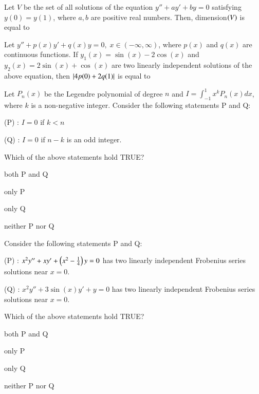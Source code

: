 \documentclass[journal]{IEEEtran}
\numberwithin{equation}{enumi}
\numberwithin{figure}{enumi}
\begin{document}
\begin{enumerate}
{\hfill{}

\item Let $V$ be the set of all solutions of the equation $y'' + a y' + b y = 0$ satisfying $y(0) = y(1)$, where $a, b$ are positive real numbers. Then, dimension$\left(V\right)$ is equal to \underline

\hfill{}

\item Let $y'' + p(x) y' + q(x) y = 0, \; x \in (-\infty, \infty)$, where $p(x)$ and $q(x)$ are continuous functions. If $y_1(x) = \sin(x) - 2\cos(x)$ and $y_2(x) = 2\sin(x) + \cos(x)$ are two linearly independent solutions of the above equation, then $\left\vert4 p(0) + 2 q(1)\right\vert$ is equal to \underline

\hfill{}

\item Let $P_n(x)$ be the Legendre polynomial of degree $n$ and $I = \int_{-1}^1 x^k P_n(x)dx$, where $k$ is a non-negative integer. Consider the following statements P and Q:

(P) : $I = 0$ if $k < n$

(Q) : $I = 0$ if $n - k$ is an odd integer.

Which of the above statements hold TRUE?

\begin{enumerate}
\begin{multicols}{2}
\item both P and Q
\item only P
\item only Q
\item neither P nor Q
\end{multicols}
\end{enumerate}

\hfill{}



\item Consider the following statements P and Q:

(P) : $x^2 y'' + x y' + \left(x^2 - \frac{1}{4}\right) y = 0$ has two linearly independent Frobenius series solutions near $x=0$.

(Q) : $x^2 y'' + 3 \sin(x) y' + y = 0$ has two linearly independent Frobenius series solutions near $x=0$.

Which of the above statements hold TRUE?

\begin{enumerate}
\begin{multicols}{2}
\item both P and Q
\item only P
\item only Q
\item neither P nor Q
\end{multicols}
\end{enumerate}

}
\end{enumerate}
\end{document}
